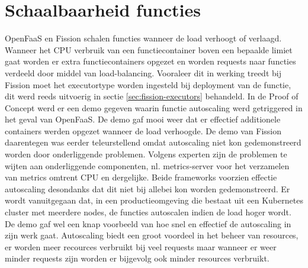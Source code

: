 \section{Schaalbaarheid functies}
OpenFaaS en Fission schalen functies wanneer de load verhoogt of verlaagd. Wanneer het CPU verbruik van een functiecontainer boven een bepaalde limiet gaat worden er extra functiecontainers opgezet en worden requests naar functies verdeeld door middel van load-balancing. Vooraleer dit in werking treedt bij Fission moet het executortype worden ingesteld bij deployment van de functie, dit werd reeds uitvoerig in sectie \ref{sec:fission-executors} behandeld. In de Proof of Concept werd er een demo gegeven waarin functie autoscaling werd getriggered in het geval van OpenFaaS. De demo gaf mooi weer dat er effectief additionele containers werden opgezet wanneer de load verhoogde. De demo van Fission daarentegen was eerder teleurstellend omdat autoscaling niet kon gedemonstreerd worden door onderliggende problemen. Volgens experten zijn de problemen te wijten aan onderliggende componenten, nl. metrics-server voor het verzamelen van metrics omtrent CPU en dergelijke. Beide frameworks voorzien effectie autoscaling desondanks dat dit niet bij allebei kon worden gedemonstreerd. Er wordt vanuitgegaan dat, in een productieomgeving die bestaat uit een Kubernetes cluster met meerdere nodes, de functies autoscalen indien de load hoger wordt. De demo gaf wel een knap voorbeeld van hoe snel en effectief de autoscaling in zijn werk gaat. Autoscaling biedt een groot voordeel in het beheer van resources, er worden meer recources verbruikt bij veel requests maar wanneer er weer minder requests zijn worden er bijgevolg ook minder resources verbruikt.